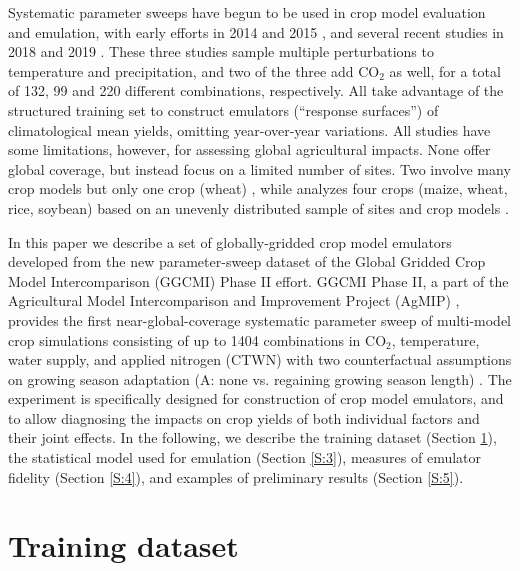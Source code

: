 \documentclass[gmd, manuscript]{copernicus} %
\begin{document}
Systematic parameter sweeps have begun to be used in crop model evaluation and emulation, with early efforts in 2014 and 2015 \citep{ruane2014, Markowski2015, Pirttioja2015}, and several recent studies in 2018 and 2019 \citep{FRONZEK20182, Snyder2018, RUIZRAMOS2018}. 
These three studies sample multiple perturbations to temperature and precipitation, and two of the three add CO$_2$ as well, for a total of 132, 99 and 220 different combinations, respectively. 
All take advantage of the structured training set to construct emulators (``response surfaces'') of climatological mean yields, omitting year-over-year variations. 
All studies have some limitations, however, for assessing global agricultural impacts. None offer global coverage, but instead focus on a limited number of sites. Two involve many crop models but only one crop (wheat) \citep{FRONZEK20182,RUIZRAMOS2018}, while \citet{Snyder2018} analyzes four crops (maize, wheat, rice, soybean) based on an unevenly distributed sample of sites and crop models \citep{mcdermid2015agmip}.

In this paper we describe a set of globally-gridded crop model emulators developed from the new parameter-sweep dataset of the Global Gridded Crop Model Intercomparison (GGCMI) Phase II effort. 
GGCMI Phase II, a part of the Agricultural Model Intercomparison and Improvement Project (AgMIP) \citep{ROSENZWEIG2013, Rosenzweig2014}, provides the first near-global-coverage systematic parameter sweep of multi-model crop simulations consisting of up to 1404 combinations in CO$_2$, temperature, water supply, and applied nitrogen (CTWN) with two counterfactual assumptions on growing season adaptation (A: none vs. regaining growing season length) \citep{franke2019ctwnexperiment,minoli2019adaptation} .
The experiment is specifically designed for construction of crop model emulators, and to allow diagnosing the impacts on crop yields of both individual factors and their joint effects.
In the following, we describe the training dataset (Section \ref{S:2}), the statistical model used for emulation (Section \ref{S:3}), measures of emulator fidelity (Section \ref{S:4}), and examples of preliminary results (Section \ref{S:5}). 

\section{Training dataset}
\label{S:2}
\end{document}
